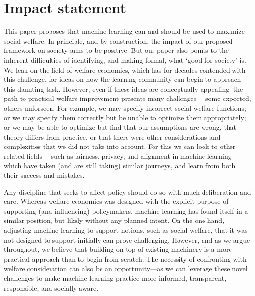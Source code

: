 \section*{Impact statement}

This paper proposes that machine learning can and should be used to maximize social welfare. In principle, and by construction, the impact of our proposed framework on society aims to be positive. But our paper also points to the inherent difficulties of identifying, and making formal, what `good for society' is. We lean on the field of welfare economics, which has for decades contended with this challenge, for ideas on how the learning community can begin to approach this daunting task.
However, even if these ideas are conceptually appealing,
the path to practical welfare improvement presents many challenges---%
some expected, others unforseen.
For example, we may specify incorrect social welfare functions;
or we may specify them correctly but be unable to optimize them appropriately;
or we may be able to optimize but find that 
our assumptions are wrong, that theory differs from practice,
or that there were other considerations and complexities that we did not take into account.
For this we can look to other related fields---%
such as fairness, privacy, and alignment in machine learning---%
which have taken (and are still taking) similar journeys,
and learn from both their success and mistakes.

Any discipline that seeks to affect policy should do so with much deliberation and care. Whereas welfare economics was designed with the explicit purpose of supporting (and influencing) policymakers,
machine learning has found itself in a similar position, but likely without any planned intent.
On the one hand, adjusting machine learning to support notions, such as social welfare,
that it was not designed to support initially can prove challenging.
However, and as we argue throughout, we believe that building on top of existing machinery is a more practical approach than to begin from scratch.
The necessity of confronting with welfare consideration can also
be an opportunity---as we can leverage these novel challenges
to make machine learning practice more informed, transparent, responsible, and socially aware.



